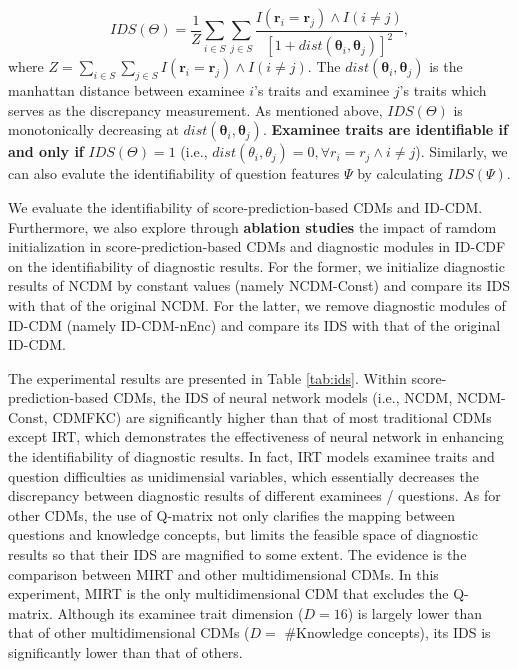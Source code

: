\documentclass[sigconf]{acmart}
\begin{document}
\vspace{-10pt}
\begin{equation}\label{eq:ids}
  IDS(\Theta) = \frac{1}{Z}\sum_{i \in S}\sum_{j \in S}\frac{I(\bm{r}_{i}=\bm{r}_j) \land I(i \neq j)}{\left[1 + dist(\bm{\theta}_i, \bm{\theta}_j)\right]^2},
\end{equation}
where $Z = \sum_{i \in S}\sum_{j \in S} I(\bm{r}_{i}=\bm{r}_j) \land I(i \neq j)$. The $dist(\bm{\theta}_i, \bm{\theta}_j)$ is the manhattan distance \cite{Craw2010} between examinee $i$'s traits and examinee $j$'s traits which serves as the discrepancy measurement. As mentioned above, $IDS(\Theta)$ is monotonically decreasing at $dist(\bm{\theta}_i, \bm{\theta}_j)$. \textbf{Examinee traits are identifiable if and only if} $IDS(\Theta) = 1$ (i.e., $dist(\theta_i,\theta_j)=0, \forall r_i=r_j\land i\neq j$). Similarly, we can also evalute the identifiability of question features $\Psi$ by calculating $IDS(\Psi)$.
\par We evaluate the identifiability of score-prediction-based CDMs and ID-CDM. Furthermore, we also explore through \textbf{ablation studies} the impact of ramdom initialization in score-prediction-based CDMs and diagnostic modules in ID-CDF on the identifiability of diagnostic results. For the former, we initialize diagnostic results of NCDM by constant values (namely NCDM-Const) and compare its IDS with that of the original NCDM. For the latter, we remove diagnostic modules of ID-CDM (namely ID-CDM-nEnc) and compare its IDS with that of the original ID-CDM. 
\par The experimental results are presented in Table \ref{tab:ids}. Within score-prediction-based CDMs, the IDS of neural network models (i.e., NCDM, NCDM-Const, CDMFKC) are significantly higher than that of most traditional CDMs except IRT, which demonstrates the effectiveness of neural network in enhancing the identifiability of diagnostic results. In fact, IRT models examinee traits and question difficulties as unidimensial variables, which essentially decreases the discrepancy between diagnostic results of different examinees / questions. As for other CDMs, the use of Q-matrix not only clarifies the mapping between questions and knowledge concepts, but limits the feasible space of diagnostic results so that their IDS are magnified to some extent. The evidence is the comparison between MIRT and other multidimensional CDMs. In this experiment, MIRT is the only multidimensional CDM that excludes the Q-matrix. Although its examinee trait dimension ($D = 16$) is largely lower than that of other multidimensional CDMs ($D=$ \#Knowledge concepts), its IDS is significantly lower than that of others. 
\end{document}
